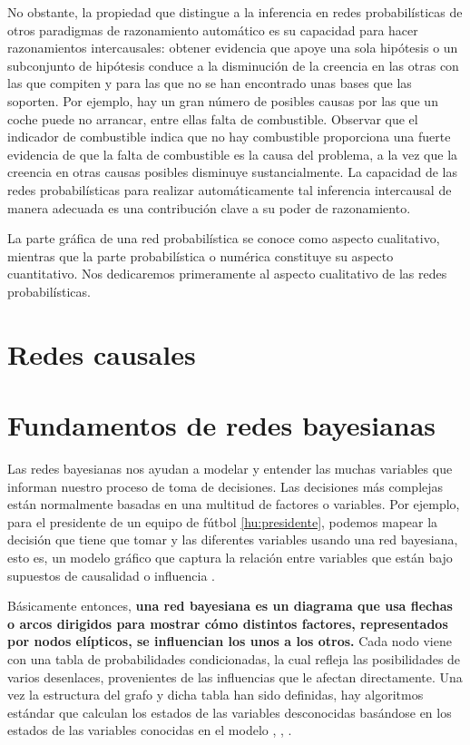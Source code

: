 No obstante, la propiedad que distingue a la inferencia en redes probabilísticas
de otros paradigmas de razonamiento automático es su capacidad para hacer razonamientos intercausales: 
obtener evidencia que apoye una sola hipótesis o un subconjunto de
hipótesis conduce a la disminución de la creencia en las otras con las que compiten y para las que no se 
han encontrado unas bases que las soporten. Por ejemplo, hay un gran número de posibles causas por las 
que un coche puede no arrancar, entre ellas falta de combustible. Observar que el indicador de combustible 
indica que no hay combustible proporciona una fuerte evidencia de que la falta de combustible es la causa 
del problema, a la vez que la creencia en otras causas posibles disminuye sustancialmente. La capacidad 
de las redes probabilísticas para realizar automáticamente tal inferencia intercausal de manera adecuada 
es una contribución clave a su poder de razonamiento.

La parte gráfica de una red probabilística se conoce como aspecto cualitativo, mientras que la 
parte probabilística o numérica constituye su aspecto cuantitativo. Nos dedicaremos primeramente al aspecto 
cualitativo de las redes probabilísticas.

\section{Redes causales}

\section{Fundamentos de redes bayesianas}
Las redes bayesianas nos ayudan a modelar y entender las muchas variables que informan nuestro proceso de 
toma de decisiones. Las decisiones más complejas están normalmente basadas en una multitud de factores o 
variables. Por ejemplo, para el presidente de un equipo de fútbol \ref{hu:presidente}, podemos 
mapear la decisión que tiene que tomar y las diferentes variables usando 
una red bayesiana, esto es, un modelo gráfico que captura la relación entre variables que están bajo 
supuestos de causalidad o influencia \cite{things-to-know-BN}.

Básicamente entonces, \textbf{una red bayesiana es un diagrama que 
usa flechas o arcos dirigidos para mostrar cómo distintos factores, representados por nodos elípticos, se 
influencian los unos a los otros.} Cada nodo viene con una tabla de probabilidades condicionadas, la cual refleja las 
posibilidades de varios desenlaces, provenientes de las influencias que le afectan directamente. Una vez 
la estructura del grafo y dicha tabla han sido definidas, hay algoritmos estándar que 
calculan los estados de las variables desconocidas basándose en los estados de las variables conocidas en el
modelo \cite{learning-algorithms-BN-comparison}, \cite{BN-achilles-heel}, \cite{different-algorithmic-schemes}.

